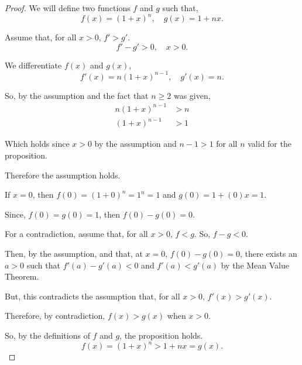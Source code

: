 \documentclass[../hw4.texz]{subfiles}
\begin{document}
\begin{proof} %
    We will define two functions $f$ and $g$ such that,
    \[f(x) = {(1+x)}^n, \quad g(x) = 1+nx.\]

    Assume that, for all $x>0$, $f'>g'$.
    \[f'-g'>0, \quad x>0.\]

    We differentiate $f(x)$ and $g(x)$,
    \[f'(x) = n{(1+x)}^{n-1}, \quad g'(x) = n.\]

    So, by the assumption and the fact that $n\geq2$ was given,
    \begin{align*}
        n{(1+x)}^{n-1} &> n \\
        {(1+x)}^{n-1} &> 1
    \end{align*}

    Which holds since $x>0$ by the assumption and $n-1>1$ for all $n$ valid for the proposition.

    Therefore the assumption holds.

    If $x=0$, then $f(0)={(1+0)}^n=1^n=1$ and $g(0)=1+(0)x=1$.

    Since, $f(0)=g(0)=1$, then $f(0)-g(0)=0$.

    For a contradiction, assume that, for all $x>0$, $f<g$. So, $f-g<0$.

    Then, by the assumption, and that, at $x=0$, $f(0)-g(0)=0$, there exists an $a>0$ such that $f'(a)-g'(a)<0$ and $f'(a)<g'(a)$ by the Mean Value Theorem.

    But, this contradicts the assumption that, for all $x>0$, $f'(x)>g'(x)$.

    Therefore, by contradiction, $f(x)>g(x)$ when $x>0$.
    
    So, by the definitions of $f$ and $g$, the proposition holds.
    \[f(x) = {(1+x)}^n > 1+nx = g(x).\]

\end{proof}
\end{document}
